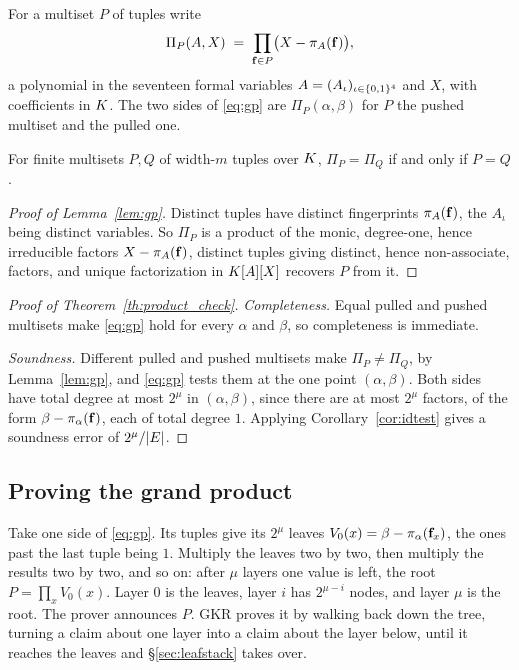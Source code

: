 \begin{lemma}\label{lem:gp}
For a multiset $P$ of tuples write
\[
  \Pi_P(A,X)\;=\;\prod_{\mathbf{f}\in P}\bigl(X-\pi_A(\mathbf{f})\bigr),
\]
a polynomial in the seventeen formal variables $A=(A_\iota)_{\iota\in\{0,1\}^{4}}$ and $X$, with coefficients in $K$. The two sides of \eqref{eq:gp} are $\Pi_P(\alpha,\beta)$ for $P$ the pushed multiset and the pulled one.

For finite multisets $P,Q$ of width-$m$ tuples over $K$, $\Pi_P=\Pi_Q$ if and only if $P=Q$.
\end{lemma}

\begin{proof}[Proof of Lemma~\ref{lem:gp}]
Distinct tuples have distinct fingerprints $\pi_A(\mathbf{f})$, the $A_\iota$ being distinct variables. So $\Pi_P$ is a product of the monic, degree-one, hence irreducible factors $X-\pi_A(\mathbf{f})$, distinct tuples giving distinct, hence non-associate, factors, and unique factorization in $K[A][X]$ recovers $P$ from it.
\end{proof}


\begin{proof}[Proof of Theorem~\ref{th:product_check}]
\emph{Completeness.} Equal pulled and pushed multisets make \eqref{eq:gp} hold for every $\alpha$ and $\beta$, so completeness is immediate.

\emph{Soundness.} Different pulled and pushed multisets make $\Pi_P\neq\Pi_Q$, by Lemma~\ref{lem:gp}, and \eqref{eq:gp} tests them at the one point $(\alpha, \beta)$. Both sides have total degree at most $2^{\mu}$ in $(\alpha, \beta)$, since there are at most $2^{\mu}$ factors, of the form $\beta-\pi_\alpha(\mathbf{f})$, each of total degree $1$. Applying Corollary~\ref{cor:idtest} gives a soundness error of $2^{\mu}/|E|$.
\end{proof}

\subsection{Proving the grand product}\label{sec:gkr}

Take one side of \eqref{eq:gp}. Its tuples give its $2^{\mu}$ leaves $V_0(x)=\beta-\pi_\alpha(\mathbf{f}_x)$, the ones past the last tuple being $1$. Multiply the leaves two by two, then multiply the results two by two, and so on: after $\mu$ layers one value is left, the root $P=\prod_xV_0(x)$. Layer $0$ is the leaves, layer $i$ has $2^{\mu-i}$ nodes, and layer $\mu$ is the root. The prover announces $P$. GKR proves it by walking back down the tree, turning a claim about one layer into a claim about the layer below, until it reaches the leaves and \S\ref{sec:leafstack} takes over.

